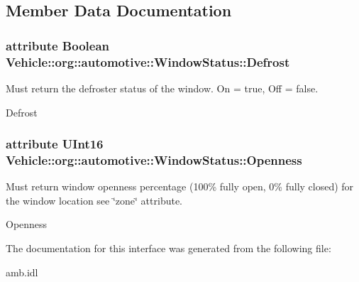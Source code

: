 \subsection{Member Data Documentation}
\hypertarget{interfaceVehicle_1_1org_1_1automotive_1_1WindowStatus_a57859718967ac3a49f7aa26bf6972826}{
\subsubsection[{Defrost}]{\setlength{\rightskip}{0pt plus 5cm}attribute Boolean Vehicle\-::org\-::automotive\-::\-Window\-Status\-::\-Defrost}}\label{interfaceVehicle_1_1org_1_1automotive_1_1WindowStatus_a57859718967ac3a49f7aa26bf6972826}


Must return the defroster status of the window. On = true, Off = false. 

Defrost \hypertarget{interfaceVehicle_1_1org_1_1automotive_1_1WindowStatus_a9b8341d77c516c81517a22728f5b74e5}{
\subsubsection[{Openness}]{\setlength{\rightskip}{0pt plus 5cm}attribute U\-Int16 Vehicle\-::org\-::automotive\-::\-Window\-Status\-::\-Openness}}\label{interfaceVehicle_1_1org_1_1automotive_1_1WindowStatus_a9b8341d77c516c81517a22728f5b74e5}


Must return window openness percentage (100\% fully open, 0\% fully closed) for the window location see \char`\"{}zone\char`\"{} attribute. 

Openness 

The documentation for this interface was generated from the following file\-:\begin{DoxyCompactItemize}
\item 
amb.\-idl\end{DoxyCompactItemize}

